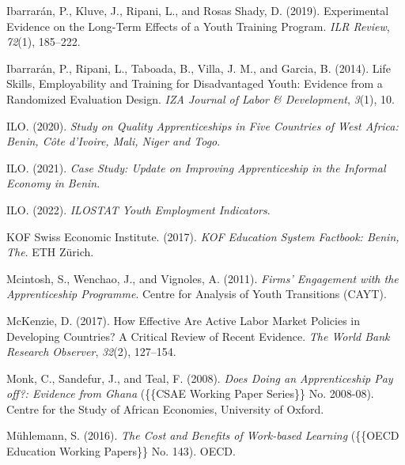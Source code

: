 \documentclass[
  11pt,
a4paper
]{report}
\newlength{\cslhangindent}
\newenvironment{CSLReferences}[2] %
 {%
  \setlength{\parindent}{0pt}
  \ifodd #1 \everypar{\setlength{\hangindent}{\cslhangindent}}\ignorespaces\fi
  \ifnum #2 > 0
  \setlength{\parskip}{#2\baselineskip}
  \fi
 }%
 {}
\begin{document}
\begin{CSLReferences}{1}{0}
\leavevmode{}%
Ibarrarán, P., Kluve, J., Ripani, L., and Rosas Shady, D. (2019). Experimental {Evidence} on the {Long-Term Effects} of a {Youth Training Program}. \emph{ILR Review}, \emph{72}(1), 185--222.

\leavevmode{}%
Ibarrarán, P., Ripani, L., Taboada, B., Villa, J. M., and Garcia, B. (2014). Life {Skills}, {Employability} and {Training} for {Disadvantaged Youth}: {Evidence} from a {Randomized Evaluation Design}. \emph{IZA Journal of Labor \& Development}, \emph{3}(1), 10.

\leavevmode{}%
ILO. (2020). \emph{Study on {Quality Apprenticeships} in {Five Countries} of {West Africa}: {Benin}, {Côte} d'{Ivoire}, {Mali}, {Niger} and {Togo}}.

\leavevmode{}%
ILO. (2021). \emph{Case {Study}: {Update} on {Improving Apprenticeship} in the {Informal Economy} in {Benin}}.

\leavevmode{}%
ILO. (2022). \emph{{ILOSTAT Youth Employment Indicators}}.

\leavevmode{}%
KOF Swiss Economic Institute. (2017). \emph{{KOF Education System Factbook}: {Benin}, {The}}. {ETH Zürich}.

\leavevmode{}%
Mcintosh, S., Wenchao, J., and Vignoles, A. (2011). \emph{Firms' {Engagement} with the {Apprenticeship Programme}}. {Centre for Analysis of Youth Transitions (CAYT)}.

\leavevmode{}%
McKenzie, D. (2017). How {Effective Are Active Labor Market Policies} in {Developing Countries}? {A Critical Review} of {Recent Evidence}. \emph{The World Bank Research Observer}, \emph{32}(2), 127--154.

\leavevmode{}%
Monk, C., Sandefur, J., and Teal, F. (2008). \emph{Does {Doing} an {Apprenticeship Pay} off?: {Evidence} from {Ghana}} (\{\{CSAE Working Paper Series\}\} No. 2008-08). {Centre for the Study of African Economies, University of Oxford}.

\leavevmode{}%
Mühlemann, S. (2016). \emph{The {Cost} and {Benefits} of {Work-based Learning}} (\{\{OECD Education Working Papers\}\} No. 143). {OECD}.


\end{CSLReferences}
\end{document}
